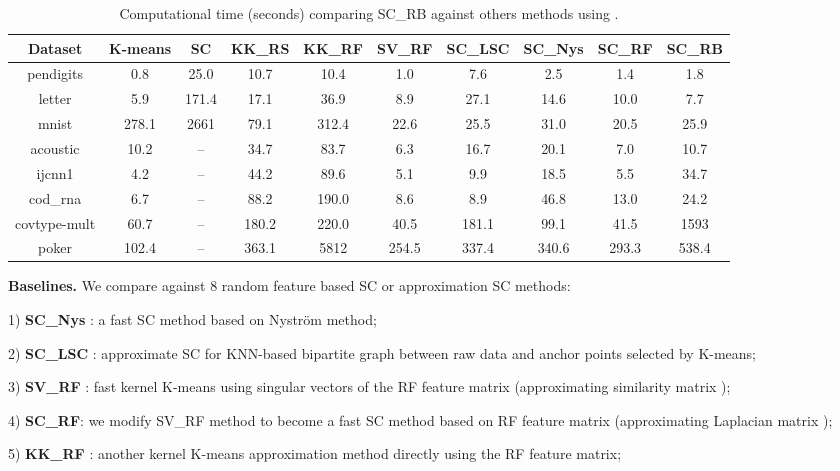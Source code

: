 \documentclass[sigconf]{acmart}
\newcommand{\1}{\boldsymbol{1}}
\newcommand{\0}{\boldsymbol{0}}
\begin{document}
\begin{table*}[t]
\centering
\caption{Computational time (seconds) comparing SC\_RB against others methods using .}
\vspace{0mm}
\label{tb:runtime_alldata}
\newcommand{\Bd}[1]{\textbf{#1}}
\begin{center}
    \begin{tabular}{ c c c c c c c c c c}
    \hline
    Dataset & K-means & SC & KK\_RS & KK\_RF & SV\_RF & SC\_LSC & SC\_Nys & SC\_RF & SC\_RB \\ \hline 
    pendigits  & 0.8 & 25.0 & 10.7 & 10.4 & 1.0 & 7.6 & 2.5 & 1.4 & 1.8 \\ 
    letter	 & 5.9 & 171.4 & 17.1 & 36.9 & 8.9 & 27.1 & 14.6 & 10.0 & 7.7 \\ 
    mnist	& 278.1 & 2661 & 79.1 & 312.4 & 22.6 & 25.5 & 31.0 & 20.5 & 25.9 \\ 
    acoustic  & 10.2 & -- & 34.7 & 83.7 & 6.3 & 16.7  & 20.1 & 7.0 & 10.7 \\ 
    ijcnn1  & 4.2 & -- & 44.2 & 89.6 & 5.1 & 9.9  & 18.5 & 5.5 & 34.7 \\ 
    cod\_rna  & 6.7 & -- & 88.2 & 190.0 & 8.6 & 8.9 & 46.8 & 13.0 & 24.2 \\ 
    covtype-mult  & 60.7 & -- & 180.2 & 220.0 & 40.5 & 181.1 & 99.1 & 41.5 & 1593 \\ 
    poker  & 102.4 & -- & 363.1 & 5812 & 254.5 & 337.4 & 340.6 & 293.3 & 538.4  \\ \hline
    \end{tabular}
\end{center}
\end{table*}


\textbf{Baselines.} We compare against 8 random feature based SC or approximation SC methods:

1) \textbf{SC\_Nys} \cite{fowlkes2004spectral}: a fast SC method based on Nystr{\"o}m method; 

2) \textbf{SC\_LSC} \cite{chen2011large}: approximate SC for KNN-based bipartite graph between raw data and anchor points selected by K-means;

3) \textbf{SV\_RF} \cite{chitta2012efficient}: fast kernel K-means using singular vectors of the RF feature matrix (approximating similarity matrix ); 

4) \textbf{SC\_RF}: we modify SV\_RF method to become a fast SC method based on RF feature matrix (approximating Laplacian matrix ); 

5) \textbf{KK\_RF} \cite{chitta2012efficient}: another kernel K-means approximation method directly using the RF feature matrix; 
\end{document}
